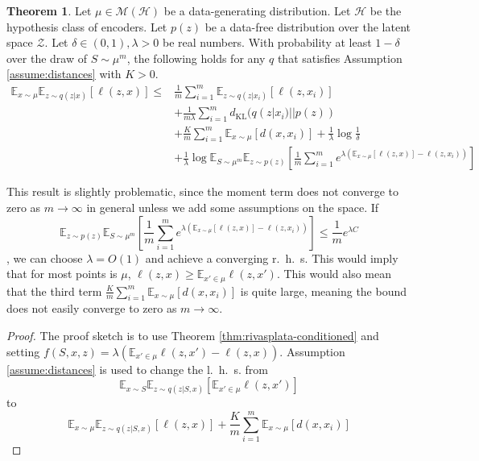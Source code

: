 \documentclass[letterpaper]{article}
\theoremstyle{definition}
\newtheorem{theorem}{Theorem}
\begin{document}
\begin{theorem}
Let $\mu\in \mathcal{M}(\mathcal{H})$ be a data-generating distribution. Let $\mathcal{H}$ be the hypothesis class of encoders. Let $p(z)$ be a data-free distribution over the latent space $\mathcal{Z}$. Let $\delta\in (0,1), \lambda>0$ be real numbers.
With probability at least $1-\delta$ over the draw of $S\sim \mu^m$,
the following holds for any $q$ that satisfies Assumption \ref{assume:distances} with $K>0$.
\begin{equation}
\begin{split}
    \mathbb{E}_{x\sim \mu}\mathbb{E}_{z\sim q(z|x)}\left [\ell(z,x) \right ]\leq &\frac{1}{m}\sum_{i=1}^{m}\mathbb{E}_{z\sim q(z|x_{i})}\left [\ell(z,x_{i}) \right ]\\
    &+ \frac{1}{m\lambda}\sum_{i=1}^{m}d_{\mathrm{KL}}(q(z|x_{i})||p(z)) \\
    & + \frac{K}{m}\sum_{i=1}^{m}\mathbb{E}_{x\sim \mu}\left [d(x,x_{i}) \right ]+\frac{1}{\lambda}\log\frac{1}{\delta} \\
    &+ \frac{1}{\lambda}\log  \mathbb{E}_{S\sim \mu^m} \mathbb{E}_{z\sim p(z)}\left [\frac{1}{m}\sum_{i=1}^{m}e^{\lambda(\mathbb{E}_{x\sim \mu}\left [\ell(z,x)\right ]-\ell(z,x_{i}))}\right ]
\end{split}
\end{equation}
\end{theorem}

This result is slightly problematic, since the moment term does not converge to zero as $m\rightarrow\infty$ in general unless we add some assumptions on the space.
If $$\mathbb{E}_{z\sim p(z)}\mathbb{E}_{S\sim \mu^m} \left [\frac{1}{m}\sum_{i=1}^{m}e^{\lambda(\mathbb{E}_{x\sim \mu}\left [\ell(z,x)\right ]-\ell(z,x_{i}))}\right ]\leq \frac{1}{m}e^{\lambda C}$$,
we can choose $\lambda=O(1)$ and achieve a converging r.\ h.\ s. 
This would imply that for most points is $\mu$, $\ell(z,x)\geq \mathbb{E}_{x'\in \mu}\ell(z,x')$. This would also mean that the third term $\frac{K}{m}\sum_{i=1}^{m}\mathbb{E}_{x\sim \mu}\left [d(x,x_{i}) \right ]$ is quite large, meaning the bound does not easily converge to zero as $m\rightarrow\infty$.

\begin{proof}
    The proof sketch is to use Theorem \ref{thm:rivasplata-conditioned}
    and setting $f(S,x,z)=\lambda(\mathbb{E}_{x'\in \mu}\ell(z,x')-\ell(z,x))$.
    Assumption \ref{assume:distances} is used to change the l.\ h.\ s. from $$\mathbb{E}_{x\sim S}\mathbb{E}_{z\sim q(z|S,x)}\left [\mathbb{E}_{x'\in \mu}\ell(z,x')\right]$$ to $$\mathbb{E}_{x\sim \mu}\mathbb{E}_{z\sim q(z|S,x)}\left [\ell(z,x)\right]+\frac{K}{m}\sum_{i=1}^{m}\mathbb{E}_{x\sim \mu}\left [d(x,x_{i}) \right ]$$
\end{proof}
\end{document}
